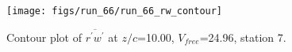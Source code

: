 \begin{figure}[H]
\centering
\texttt{[image: figs/run\_66/run\_66\_rw\_contour]}
\caption{Contour plot of $\overline{r^\prime w^\prime}$ at $z/c$=10.00, $V_{free}$=24.96, station 7.}
\label{fig:run_66_rw_contour}
\end{figure}


